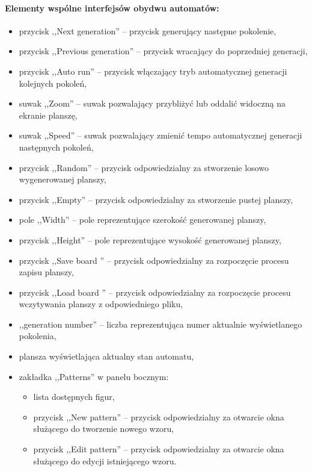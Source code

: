 \documentclass{mwart}
\begin{document}
\paragraph{Elementy wspólne interfejsów obydwu automatów:}
\begin{itemize}
	\item przycisk ,,Next generation'' -- przycisk generujący następne pokolenie,
	\item przycisk ,,Previous generation'' -- przycisk wracający do poprzedniej generacji,
	\item przycisk ,,Auto run'' -- przycisk włączający tryb automatycznej generacji kolejnych pokoleń,
	\item suwak ,,Zoom'' -- suwak pozwalający przybliżyć lub oddalić widoczną na ekranie planszę,
	\item suwak ,,Speed'' -- suwak pozwalający zmienić tempo automatycznej generacji następnych pokoleń,
	\item przycisk ,,Random'' -- przycisk odpowiedzialny za stworzenie losowo wygenerowanej planszy,
	\item przycisk ,,Empty'' -- przycisk odpowiedzialny za stworzenie pustej planszy,
	\item pole ,,Width'' -- pole reprezentujące szerokość generowanej planszy,
	\item przycisk ,,Height'' -- pole reprezentujące wysokość generowanej planszy,
	\item przycisk ,,Save board '' -- przycisk odpowiedzialny za rozpoczęcie procesu zapisu planszy,
	\item przycisk ,,Load board '' -- przycisk odpowiedzialny za rozpoczęcie procesu wczytywania planszy z odpowiedniego pliku,
	\item ,,generation number'' -- liczba reprezentująca numer aktualnie wyświetlanego pokolenia,
	\item plansza wyświetlająca aktualny stan automatu,
	\item zakładka ,,Patterns'' w panelu bocznym:
	\begin{itemize}
		\item lista dostępnych figur,
		\item przycisk ,,New pattern'' -- przycisk odpowiedzialny za otwarcie okna służącego do tworzenie nowego wzoru,
		\item przycisk ,,Edit pattern'' -- przycisk odpowiedzialny za otwarcie okna służącego do edycji istniejącego wzoru.
	\end{itemize}
\end{itemize}
\end{document}
